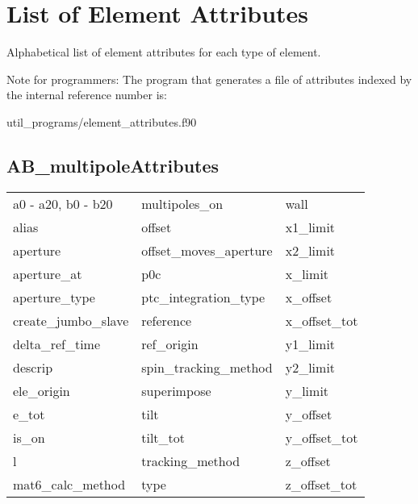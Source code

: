 \chapter{List of Element Attributes}
\label{c:attrib.list}

Alphabetical list of element attributes for each type of element. 

Note for programmers: The program that generates a file of attributes indexed by the
internal reference number is:
\begin{example}
  util_programs/element_attributes.f90 
\end{example}

 \section{AB_multipoleAttributes}
 \label{s:list.ab.multipole}
 
 \begin{tabular}{lll} \toprule
a0 - a20, b0 - b20          & multipoles_on               & wall                        \\
alias                       & offset                      & x1_limit                    \\
aperture                    & offset_moves_aperture       & x2_limit                    \\
aperture_at                 & p0c                         & x_limit                     \\
aperture_type               & ptc_integration_type        & x_offset                    \\
create_jumbo_slave          & reference                   & x_offset_tot                \\
delta_ref_time              & ref_origin                  & y1_limit                    \\
descrip                     & spin_tracking_method        & y2_limit                    \\
ele_origin                  & superimpose                 & y_limit                     \\
e_tot                       & tilt                        & y_offset                    \\
is_on                       & tilt_tot                    & y_offset_tot                \\
l                           & tracking_method             & z_offset                    \\
mat6_calc_method            & type                        & z_offset_tot                \\
 \bottomrule
 \end{tabular}
 \vfill
 
